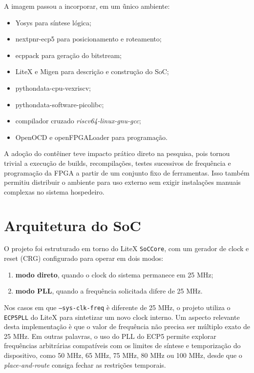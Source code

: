 \documentclass[10pt,twocolumn,a4paper]{article}
\begin{document}
A imagem passou a incorporar, em um \~unico ambiente:
\begin{itemize}[leftmargin=*]
    \item Yosys para s\'intese l\'ogica;
    \item nextpnr-ecp5 para posicionamento e roteamento;
    \item ecppack para gera\c{c}\~ao do bitstream;
    \item LiteX e Migen para descri\c{c}\~ao e constru\c{c}\~ao do SoC;
    \item pythondata-cpu-vexriscv;
    \item pythondata-software-picolibc;
    \item compilador cruzado \textit{riscv64-linux-gnu-gcc};
    \item OpenOCD e openFPGALoader para programa\c{c}\~ao.
\end{itemize}

A ado\c{c}\~ao do cont\^einer teve impacto pr\'atico direto na pesquisa, pois tornou trivial a execu\c{c}\~ao de builds, recompila\c{c}\~oes, testes sucessivos de frequ\^encia e programa\c{c}\~ao da FPGA a partir de um conjunto fixo de ferramentas. Isso tamb\'em permitiu distribuir o ambiente para uso externo sem exigir instala\c{c}\~oes manuais complexas no sistema hospedeiro.

\section{Arquitetura do SoC}
O projeto foi estruturado em torno do LiteX \texttt{SoCCore}, com um gerador de clock e reset (CRG) configurado para operar em dois modos:
\begin{enumerate}[leftmargin=*]
    \item \textbf{modo direto}, quando o clock do sistema permanece em 25 MHz;
    \item \textbf{modo PLL}, quando a frequ\^encia solicitada difere de 25 MHz.
\end{enumerate}

Nos casos em que \texttt{--sys-clk-freq} \`e diferente de 25 MHz, o projeto utiliza o \texttt{ECP5PLL} do LiteX para sintetizar um novo clock interno. Um aspecto relevante desta implementa\c{c}\~ao \`e que o valor de frequ\^encia n\~ao precisa ser m\'ultiplo exato de 25 MHz. Em outras palavras, o uso do PLL do ECP5 permite explorar frequ\^encias arbitr\'arias compat\'iveis com os limites de s\'intese e temporiza\c{c}\~ao do dispositivo, como 50 MHz, 65 MHz, 75 MHz, 80 MHz ou 100 MHz, desde que o \textit{place-and-route} consiga fechar as restri\c{c}\~oes temporais.
\end{document}
